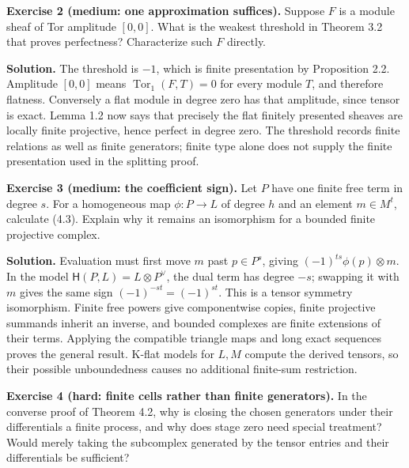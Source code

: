 \documentclass[
  english,
  11pt,
  a4paper,
]{article}
\begin{document}
\textbf{Exercise 2 (medium: one approximation suffices).} Suppose \(F\)
is a module sheaf of Tor amplitude \([0,0]\). What is the weakest
threshold in Theorem 3.2 that proves perfectness? Characterize such
\(F\) directly.

\textbf{Solution.} The threshold is \(-1\), which is finite presentation
by Proposition 2.2. Amplitude \([0,0]\) means
\(\operatorname{Tor}_1(F,T)=0\) for every module \(T\), and therefore
flatness. Conversely a flat module in degree zero has that amplitude,
since tensor is exact. Lemma 1.2 now says that precisely the flat
finitely presented sheaves are locally finite projective, hence perfect
in degree zero. The threshold records finite relations as well as finite
generators; finite type alone does not supply the finite presentation
used in the splitting proof.

\textbf{Exercise 3 (medium: the coefficient sign).} Let \(P\) have one
finite free term in degree \(s\). For a homogeneous map \(\phi:P\to L\)
of degree \(h\) and an element \(m\in M^t\), calculate (4.3). Explain
why it remains an isomorphism for a bounded finite projective complex.

\textbf{Solution.} Evaluation must first move \(m\) past \(p\in P^s\),
giving \((-1)^{ts}\phi(p)\otimes m\). In the model
\(\mathsf H(P,L)=L\otimes P^\vee\), the dual term has degree \(-s\);
swapping it with \(m\) gives the same sign \((-1)^{-st}=(-1)^{st}\).
This is a tensor symmetry isomorphism. Finite free powers give
componentwise copies, finite projective summands inherit an inverse, and
bounded complexes are finite extensions of their terms. Applying the
compatible triangle maps and long exact sequences proves the general
result. K-flat models for \(L,M\) compute the derived tensors, so their
possible unboundedness causes no additional finite-sum restriction.

\textbf{Exercise 4 (hard: finite cells rather than finite generators).}
In the converse proof of Theorem 4.2, why is closing the chosen
generators under their differentials a finite process, and why does
stage zero need special treatment? Would merely taking the subcomplex
generated by the tensor entries and their differentials be sufficient?
\end{document}

